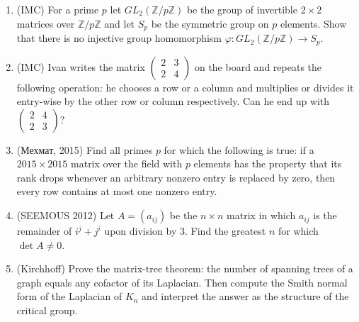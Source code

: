 \documentclass[11pt,a4paper]{article}
\begin{document}
\begin{enumerate}
\item (IMC) For a prime $p$ let $GL_2(\mathbb Z/p\mathbb Z)$ be the group of invertible $2\times2$
matrices over $\mathbb Z/p\mathbb Z$ and let $S_p$ be the symmetric group on $p$ elements. Show
that there is no injective group homomorphism $\varphi\colon GL_2(\mathbb Z/p\mathbb Z)\to S_p$.

\item (IMC) Ivan writes the matrix $\begin{pmatrix}2&3\\2&4\end{pmatrix}$ on the board and repeats
the following operation: he chooses a row or a column and multiplies or divides it entry-wise by
the other row or column respectively. Can he end up with
$\begin{pmatrix}2&4\\2&3\end{pmatrix}$?

\item (\foreignlanguage{russian}{Мехмат}, 2015) Find all primes $p$ for which the following is
true: if a $2015\times2015$ matrix over the field with $p$ elements has the property that its
rank drops whenever an arbitrary nonzero entry is replaced by zero, then every row contains at
most one nonzero entry.

\item (SEEMOUS 2012) Let $A=(a_{ij})$ be the $n\times n$ matrix in which $a_{ij}$ is the
remainder of $i^j+j^i$ upon division by $3$. Find the greatest $n$ for which $\det A\ne0$.

\item (Kirchhoff) Prove the matrix-tree theorem: the number of spanning trees of a graph equals
any cofactor of its Laplacian. Then compute the Smith normal form of the Laplacian of $K_n$ and
interpret the answer as the structure of the critical group.
\end{enumerate}
\end{document}
